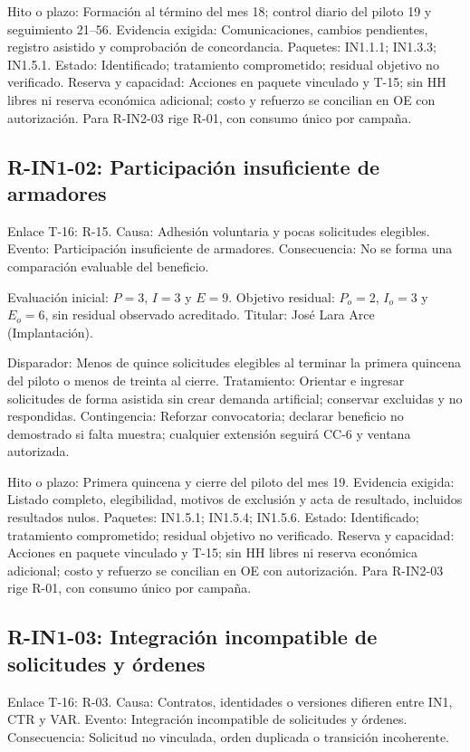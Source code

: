 Hito o plazo: Formación al término del mes 18; control diario del piloto 19 y seguimiento 21--56. Evidencia exigida: Comunicaciones, cambios pendientes, registro asistido y comprobación de concordancia. Paquetes: IN1.1.1; IN1.3.3; IN1.5.1. Estado: Identificado; tratamiento comprometido; residual objetivo no verificado. Reserva y capacidad: Acciones en paquete vinculado y T-15; sin HH libres ni reserva económica adicional; costo y refuerzo se concilian en OE con autorización. Para R-IN2-03 rige R-01, con consumo único por campaña.

\subsection{R-IN1-02: Participación insuficiente de armadores}
Enlace T-16: R-15. Causa: Adhesión voluntaria y pocas solicitudes elegibles. Evento: Participación insuficiente de armadores. Consecuencia: No se forma una comparación evaluable del beneficio.

Evaluación inicial: $P=3$, $I=3$ y $E=9$. Objetivo residual: $P_o=2$, $I_o=3$ y $E_o=6$, sin residual observado acreditado. Titular: José Lara Arce (Implantación).

Disparador: Menos de quince solicitudes elegibles al terminar la primera quincena del piloto o menos de treinta al cierre. Tratamiento: Orientar e ingresar solicitudes de forma asistida sin crear demanda artificial; conservar excluidas y no respondidas. Contingencia: Reforzar convocatoria; declarar beneficio no demostrado si falta muestra; cualquier extensión seguirá CC-6 y ventana autorizada.

Hito o plazo: Primera quincena y cierre del piloto del mes 19. Evidencia exigida: Listado completo, elegibilidad, motivos de exclusión y acta de resultado, incluidos resultados nulos. Paquetes: IN1.5.1; IN1.5.4; IN1.5.6. Estado: Identificado; tratamiento comprometido; residual objetivo no verificado. Reserva y capacidad: Acciones en paquete vinculado y T-15; sin HH libres ni reserva económica adicional; costo y refuerzo se concilian en OE con autorización. Para R-IN2-03 rige R-01, con consumo único por campaña.

\subsection{R-IN1-03: Integración incompatible de solicitudes y órdenes}
Enlace T-16: R-03. Causa: Contratos, identidades o versiones difieren entre IN1, CTR y VAR. Evento: Integración incompatible de solicitudes y órdenes. Consecuencia: Solicitud no vinculada, orden duplicada o transición incoherente.

